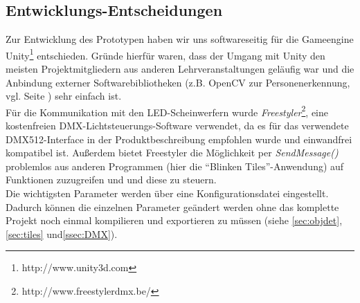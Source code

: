 \subsection{Entwicklungs-Entscheidungen}\label{ssec:entscheidungen}

Zur Entwicklung des Prototypen haben wir uns softwareseitig für die Gameengine Unity\footnote{http://www.unity3d.com} entschieden.
Gründe hierfür waren, dass der Umgang mit Unity den meisten Projektmitgliedern aus anderen Lehrveranstaltungen geläufig war und die Anbindung externer Softwarebibliotheken (z.B. OpenCV zur Personenerkennung, vgl. Seite \pageref{sec:objdet}) sehr einfach ist.\\
Für die Kommunikation mit den LED-Scheinwerfern wurde \emph{Freestyler}\footnote{http://www.freestylerdmx.be/}, eine kostenfreien DMX-Lichtsteuerungs-Software verwendet, da es für das verwendete DMX512-Interface in der Produktbeschreibung empfohlen wurde und einwandfrei kompatibel ist. Außerdem bietet Freestyler die Möglichkeit per \emph{SendMessage()} problemlos aus anderen Programmen (hier die \enquote{Blinken Tiles}-Anwendung) auf Funktionen zuzugreifen und und diese zu steuern.\\
Die wichtigsten Parameter werden über eine Konfigurationsdatei eingestellt. Dadurch können die einzelnen Parameter geändert werden ohne das komplette Projekt noch einmal kompilieren und exportieren zu müssen (siehe \autoref{sec:objdet}, \autoref{sec:tiles} und\autoref{ssec:DMX}).